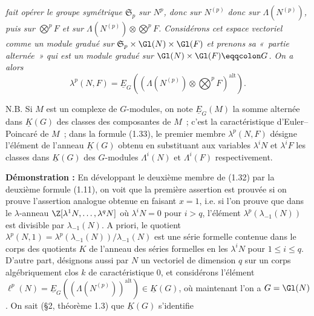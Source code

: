 \emph{fait opérer le groupe symétrique $\mathfrak S_p$ sur $N^p$, donc sur $N^{(p)}$ donc sur $\Lambda(N^{(p)})$, puis sur $\bigotimes^p F$ et sur $\Lambda(N^{(p)})\otimes\bigotimes^p F$. Considérons cet espace vectoriel comme un module gradué sur $\mathfrak S_p\times\Gl(N)\times\Gl(F)$ et prenons sa «~partie alternée~» qui est un module gradué sur $\Gl(N)\times\Gl(F)\eqqcolon G$. On a alors}
\begin{equation}\tag{1.33}
\lambda^p(N,F)=\underline{E}_G\left(\left(\Lambda(N^{(p)})\otimes\bigotimes^p F\right)^{\mathrm{alt}}\right).
\end{equation}

N.B. Si $M$ est un complexe de $G$-modules, on note $\underline{E}_G(M)$ la somme alternée dans $\underline{K}(G)$ des classes des composantes de $M$~; c'est la caractéristique d'Euler--Poincaré de $M$~; dans la formule (1.33), le premier membre $\lambda^p(N,F)$ désigne l'élément de l'anneau $\underline{K}(G)$ obtenu en substituant aux variables $\lambda^iN$ et $\lambda^iF$ les classes dans $\underline{K}(G)$ des $G$-modules $\Lambda^i(N)$ et $\Lambda^i(F)$ respectivement.

\textbf{Démonstration :} En développant le deuxième membre de (1.32) par la deuxième formule (1.11), on voit que la première assertion est prouvée si on prouve l'assertion analogue obtenue en faisant $x=1$, i.e. si l'on prouve que dans le $\lambda$-anneau $\Z[\lambda^1N,\ldots,\lambda^qN]$ où $\lambda^iN=0$ pour $i>q$, l'élément $\lambda^p(\lambda_{-1}(N))$ est divisible par $\lambda_{-1}(N)$. A priori, le quotient $\lambda^p(N,1)=\lambda^p(\lambda_{-1}(N))/\lambda_{-1}(N)$ est une série formelle contenue dans le corps des quotients $K$ de l'anneau des séries formelles en les $\lambda^iN$ pour $1\leq i\leq q$. D'autre part, désignons aussi par $N$ un vectoriel de dimension $q$ sur un corps algébriquement clos $k$ de caractéristique $0$, et considérons l'élément $\ell^p(N)=\underline{E}_G((\Lambda(N^{(p)}))^{\mathrm{alt}})\in \underline{K}(G)$, où maintenant l'on a $G=\Gl(N)$. On sait (\S 2, théorème 1.3) que $\underline{K}(G)$ s'identifie 
